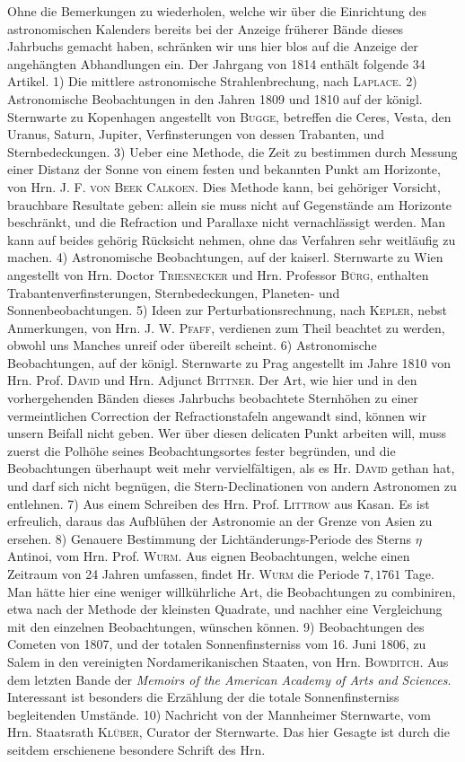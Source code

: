 Ohne die Bemerkungen zu wiederholen, welche wir über die Einrichtung des astronomischen Kalenders bereits bei der Anzeige früherer Bände dieses Jahrbuchs gemacht haben, schränken wir uns hier blos auf die Anzeige der angehängten Abhandlungen ein. Der Jahrgang von 1814 enthält folgende 34 Artikel. 1) Die mittlere astronomische Strahlenbrechung, nach \textsc{Laplace}. 2) Astronomische Beobachtungen in den Jahren 1809 und 1810 auf der königl. Sternwarte zu Kopenhagen angestellt von \textsc{Bugge}, betreffen die Ceres, Vesta, den Uranus, Saturn, Jupiter, Verfinsterungen von dessen Trabanten, und Sternbedeckungen. 3) Ueber eine Methode, die Zeit zu bestimmen durch Messung einer Distanz der Sonne von einem festen und bekannten Punkt am Horizonte, von Hrn. J. F. \textsc{von Beek Calkoen}. Dies Methode kann, bei gehöriger Vorsicht, brauchbare Resultate geben: allein sie muss nicht auf Gegenstände am Horizonte beschränkt, und die Refraction und Parallaxe nicht vernachlässigt werden. Man kann auf beides gehörig Rücksicht nehmen, ohne das Verfahren sehr weitläufig zu machen. 4) Astronomische Beobachtungen, auf der kaiserl. Sternwarte zu Wien angestellt von Hrn. Doctor \textsc{Triesnecker} und Hrn. Professor \textsc{Bürg}, enthalten Trabantenverfinsterungen, Sternbedeckungen, Planeten- und Sonnenbeobachtungen. 5) Ideen zur Perturbationsrechnung, nach \textsc{Kepler}, nebst Anmerkungen, von Hrn. J. W. \textsc{Pfaff}, verdienen zum Theil beachtet zu werden, obwohl uns Manches unreif oder übereilt scheint. 6) Astronomische Beobachtungen, auf der königl. Sternwarte zu Prag angestellt im Jahre 1810 von Hrn. Prof. \textsc{David} und Hrn. Adjunct \textsc{Bittner}. Der Art, wie hier und in den vorhergehenden Bänden dieses Jahrbuchs beobachtete Sternhöhen zu einer vermeintlichen Correction der Refractionstafeln angewandt sind, können wir unsern Beifall nicht geben. Wer über diesen delicaten Punkt arbeiten will, muss zuerst die Polhöhe seines Beobachtungsortes fester begründen, und die Beobachtungen überhaupt weit mehr vervielfältigen, als es Hr. \textsc{David} gethan hat, und darf sich nicht begnügen, die Stern-Declinationen von andern Astronomen zu entlehnen. 7) Aus einem Schreiben des Hrn. Prof. \textsc{Littrow} aus Kasan. Es ist erfreulich, daraus das Aufblühen der Astronomie an der Grenze von Asien zu ersehen. 8) Genauere Bestimmung der Lichtänderungs-Periode des Sterns $\eta$ Antinoi, vom Hrn. Prof. \textsc{Wurm}. Aus eignen Beobachtungen, welche einen Zeitraum von 24 Jahren umfassen, findet Hr. \textsc{Wurm} die Periode $7{,}1761$ Tage. Man hätte hier eine weniger willkührliche Art, die Beobachtungen zu combiniren, etwa nach der Methode der kleinsten Quadrate, und nachher eine Vergleichung mit den einzelnen Beobachtungen, wünschen können. 9) Beobachtungen des Cometen von 1807, und der totalen Sonnenfinsterniss vom 16. Juni 1806, zu Salem in den vereinigten Nordamerikanischen Staaten, von Hrn. \textsc{Bowditch}. Aus dem letzten Bande der \emph{Memoirs of the American Academy of Arts and Sciences}. Interessant ist besonders die Erzählung der die totale Sonnenfinsterniss begleitenden Umstände. 10) Nachricht von der Mannheimer Sternwarte, vom Hrn. Staatsrath \textsc{Klüber}, Curator der Sternwarte. Das hier Gesagte ist durch die seitdem erschienene besondere Schrift des Hrn. 